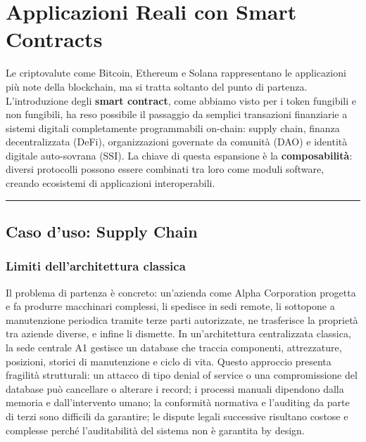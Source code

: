 \documentclass[
  italian,
  openany]{book}
\begin{document}
\section{Applicazioni Reali con Smart
Contracts}\label{applicazioni-reali-con-smart-contracts}

Le criptovalute come Bitcoin, Ethereum e Solana rappresentano le
applicazioni più note della blockchain, ma si tratta soltanto del punto
di partenza. L'introduzione degli \textbf{smart contract}, come abbiamo
visto per i token fungibili e non fungibili, ha reso possibile il
passaggio da semplici transazioni finanziarie a sistemi digitali
completamente programmabili on-chain: supply chain, finanza
decentralizzata (DeFi), organizzazioni governate da comunità (DAO) e
identità digitale auto-sovrana (SSI). La chiave di questa espansione è
la \textbf{composabilità}: diversi protocolli possono essere combinati
tra loro come moduli software, creando ecosistemi di applicazioni
interoperabili.

\begin{center}\rule{0.5\linewidth}{0.5pt}\end{center}

\subsection{Caso d'uso: Supply Chain}\label{caso-duso-supply-chain}

\subsubsection{Limiti dell'architettura
classica}\label{limiti-dellarchitettura-classica}

Il problema di partenza è concreto: un'azienda come Alpha Corporation
progetta e fa produrre macchinari complessi, li spedisce in sedi remote,
li sottopone a manutenzione periodica tramite terze parti autorizzate,
ne trasferisce la proprietà tra aziende diverse, e infine li dismette.
In un'architettura centralizzata classica, la sede centrale A1 gestisce
un database che traccia componenti, attrezzature, posizioni, storici di
manutenzione e ciclo di vita. Questo approccio presenta fragilità
strutturali: un attacco di tipo denial of service o una compromissione
del database può cancellare o alterare i record; i processi manuali
dipendono dalla memoria e dall'intervento umano; la conformità normativa
e l'auditing da parte di terzi sono difficili da garantire; le dispute
legali successive risultano costose e complesse perché l'auditabilità
del sistema non è garantita by design.
\end{document}
